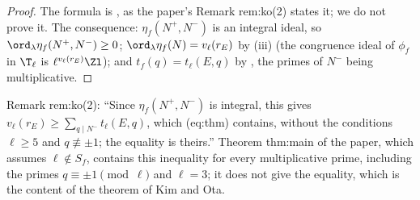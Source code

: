 \begin{proof}
The formula is \cite[Theorem 1.1]{KimOta}, as the paper's Remark rem:ko(2) states it; we do not prove it. The consequence: $\eta_f(N^+,N^-)$ is an integral ideal, so
$\ord_\lambda\eta_f(N^+,N^-)\ge0$; $\ord_\lambda\eta_f(N)=v_\ell(r_E)$ by (iii) (the congruence ideal of $\phi_f$ in $\T_\ell$ is $\ell^{v_\ell(r_E)}\Zl$); and $t_f(q)=t_\ell(E,q)$ by
, the primes of $N^-$ being multiplicative.
\end{proof}

\begin{paperlink}
Remark rem:ko(2): ``Since $\eta_f(N^+,N^-)$ is integral, this gives $v_\ell(r_E)\ge\sum_{q\mid N^-}t_\ell(E,q)$, which (eq:thm) contains, without the conditions $\ell\ge5$ and $q\not\equiv\pm1$;
the equality is theirs.'' Theorem thm:main of the paper, which assumes $\ell\notin S_f$, contains this inequality for every multiplicative prime, including the
primes $q\equiv\pm1\pmod\ell$ and $\ell=3$; it does not give the equality, which is the content of the theorem of Kim and Ota.
\end{paperlink}

